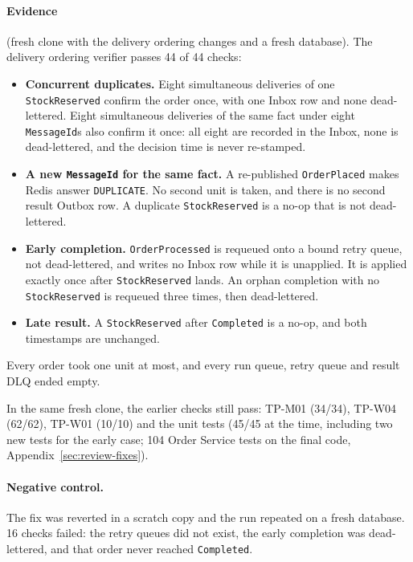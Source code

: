 \documentclass[a4paper]{report}
\begin{document}
\paragraph{Evidence} (fresh clone with the delivery ordering changes and a
fresh database). The delivery ordering verifier passes 44 of 44 checks:
\begin{itemize}
  \item \textbf{Concurrent duplicates.} Eight simultaneous deliveries of one
    \texttt{StockReserved} confirm the order once, with one Inbox row and
    none dead-lettered. Eight simultaneous deliveries of the same fact under
    eight \texttt{MessageId}s also confirm it once: all eight are recorded
    in the Inbox, none is dead-lettered, and the decision time is never
    re-stamped.
  \item \textbf{A new \texttt{MessageId} for the same fact.} A re-published
    \texttt{OrderPlaced} makes Redis answer \texttt{DUPLICATE}. No second
    unit is taken, and there is no second result Outbox row. A duplicate
    \texttt{StockReserved} is a no-op that is not dead-lettered.
  \item \textbf{Early completion.} \texttt{OrderProcessed} is requeued onto a
    bound retry queue, not dead-lettered, and writes no Inbox row while it
    is unapplied. It is applied exactly once after \texttt{StockReserved}
    lands. An orphan completion with no \texttt{StockReserved} is requeued
    three times, then dead-lettered.
  \item \textbf{Late result.} A \texttt{StockReserved} after
    \texttt{Completed} is a no-op, and both timestamps are unchanged.
\end{itemize}
Every order took one unit at most, and every run queue, retry queue and
result DLQ ended empty.

In the same fresh clone, the earlier checks still pass: TP-M01 (34/34),
TP-W04 (62/62), TP-W01 (10/10) and the unit tests (45/45 at the time,
including two new tests for the early case; 104 Order Service tests on the final code,
Appendix~\ref{sec:review-fixes}).

\paragraph{Negative control.} The fix was reverted in a scratch copy and the
run repeated on a fresh database. 16 checks failed: the retry queues did not
exist, the early completion was dead-lettered, and that order never reached
\texttt{Completed}.
\end{document}
